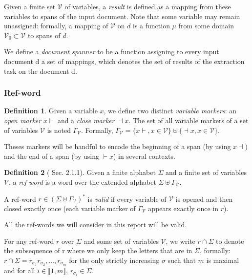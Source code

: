 \documentclass[12px]{article}
\theoremstyle{definition}
\newtheorem{definition}{Definition}
\begin{document}
        Given a finite set $\mathcal{V}$ of variables, a \textit{result} is
        defined as a mapping from these variables to spans of the input
        document.  Note that some variable may remain unassigned: formally, a
        mapping of $\mathcal{V}$ on $d$ is a function $\mu$ from some domain
        $\mathcal{V}_0 \subset \mathcal{V}$ to spans of $d$.

        We define a \textit{document spanner} to be a function assigning to
        every input document d a set of mappings, which denotes the set of
        results of the extraction task on the document d.

      \subsubsection{Ref-word}

        \begin{definition}
          Given a variable $x$, we define two distinct \textit{variable
          markers}: an \textit{open marker} $x{\vdash}$ and a \textit{close
          marker} ${\dashv}x$. The set of all variable markers of a set of
          variables $\mathcal{V}$ is noted $\Gamma_\mathcal{V}$. Formally,
          $\Gamma_\mathcal{V} = \{x{\vdash}, x \in \mathcal{V}\} \uplus
          \{{\dashv}x, x \in \mathcal{V}\}$.
        \end{definition}

        Theses markers will be handful to encode the beginning of a span (by
        using $x{\dashv}$) and the end of a span (by using ${\vdash}x$) in
        several contexts.

        \begin{definition}[\cite{peterfreund} Sec. 2.1.1]
          Given a finite alphabet $\Sigma$ and a finite set of variables
          $\mathcal{V}$, a \textit{ref-word} is a word over the extended
          alphabet $\Sigma \uplus \Gamma_\mathcal{V}$.

          A ref-word $r \in {(\Sigma \uplus \Gamma_\mathcal{V})}^*$ is
          \textit{valid} if every variable of $\mathcal{V}$ is opened and then
          closed exactly once (each variable marker of $\Gamma_\mathcal{V}$
          appears exactly once in $r$).
        \end{definition}

        All the ref-words we will consider in this report will be valid.

        For any ref-word $r$ over $\Sigma$ and some set of variables
        $\mathcal{V}$, we write $r \cap \Sigma$ to denote the subsequence of r
        where we only keep the letters that are in $\Sigma$, formally: $r \cap
        \Sigma = r_{\sigma_1} r_{\sigma_2}, \ldots, r_{\sigma_m}$ for the only
        strictly increasing $\sigma$ such that $m$ is maximal and for all $i
        \in \llbracket 1, m \rrbracket$, $r_{\sigma_i} \in \Sigma$.
\end{document}
